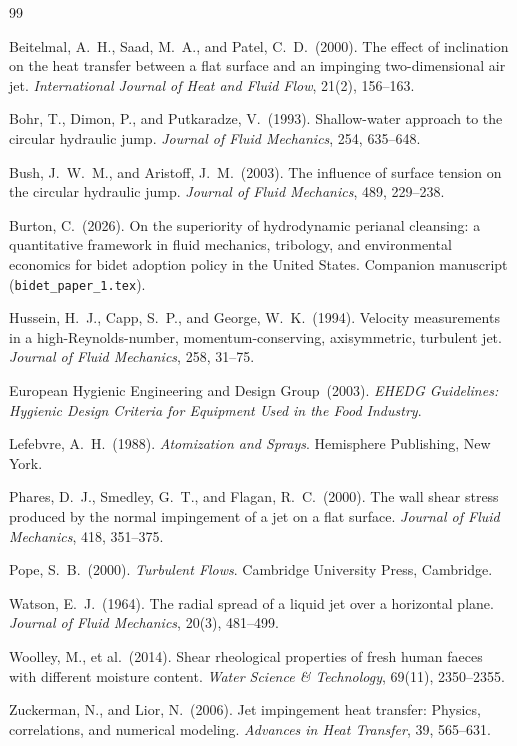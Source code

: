 \documentclass[aps,prfluids,reprint,amsmath,amssymb,floatfix]{revtex4-2}
\begin{document}
\begin{thebibliography}{99}

Beitelmal, A.~H., Saad, M.~A., and Patel, C.~D.\ (2000).
The effect of inclination on the heat transfer between a flat surface
and an impinging two-dimensional air jet.
\textit{International Journal of Heat and Fluid Flow}, 21(2), 156--163.

Bohr, T., Dimon, P., and Putkaradze, V.\ (1993).
Shallow-water approach to the circular hydraulic jump.
\textit{Journal of Fluid Mechanics}, 254, 635--648.

Bush, J.~W.~M., and Aristoff, J.~M.\ (2003).
The influence of surface tension on the circular hydraulic jump.
\textit{Journal of Fluid Mechanics}, 489, 229--238.

Burton, C.\ (2026).
On the superiority of hydrodynamic perianal cleansing: a quantitative
framework in fluid mechanics, tribology, and environmental economics
for bidet adoption policy in the United States.
Companion manuscript (\texttt{bidet\_paper\_1.tex}).

Hussein, H.~J., Capp, S.~P., and George, W.~K.\ (1994).
Velocity measurements in a high-Reynolds-number, momentum-conserving,
axisymmetric, turbulent jet.
\textit{Journal of Fluid Mechanics}, 258, 31--75.

European Hygienic Engineering and Design Group\ (2003).
\textit{EHEDG Guidelines: Hygienic Design Criteria for Equipment Used
in the Food Industry}.

Lefebvre, A.~H.\ (1988).
\textit{Atomization and Sprays}.
Hemisphere Publishing, New York.

Phares, D.~J., Smedley, G.~T., and Flagan, R.~C.\ (2000).
The wall shear stress produced by the normal impingement of a jet
on a flat surface.
\textit{Journal of Fluid Mechanics}, 418, 351--375.

Pope, S.~B.\ (2000).
\textit{Turbulent Flows}.
Cambridge University Press, Cambridge.

Watson, E.~J.\ (1964).
The radial spread of a liquid jet over a horizontal plane.
\textit{Journal of Fluid Mechanics}, 20(3), 481--499.

Woolley, M., et al.\ (2014).
Shear rheological properties of fresh human faeces with different
moisture content.
\textit{Water Science \& Technology}, 69(11), 2350--2355.

Zuckerman, N., and Lior, N.\ (2006).
Jet impingement heat transfer: Physics, correlations, and numerical
modeling.
\textit{Advances in Heat Transfer}, 39, 565--631.

\end{thebibliography}
\end{document}

